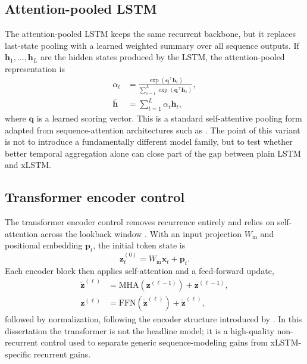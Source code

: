 \documentclass[12pt]{report}
\begin{document}
\subsection{Attention-pooled LSTM}
The attention-pooled LSTM keeps the same recurrent backbone, but it replaces last-state pooling with a learned weighted summary over all sequence outputs. If \(\mathbf{h}_1,\ldots,\mathbf{h}_L\) are the hidden states produced by the LSTM, the attention-pooled representation is
\begin{align}
\alpha_t &= \frac{\exp(\mathbf{q}^\top \mathbf{h}_t)}{\sum_{s=1}^{L}\exp(\mathbf{q}^\top \mathbf{h}_s)}, \\
\bar{\mathbf{h}} &= \sum_{t=1}^{L}\alpha_t \mathbf{h}_t,
\end{align}
where \(\mathbf{q}\) is a learned scoring vector. This is a standard self-attentive pooling form adapted from sequence-attention architectures such as \citet{lin2017selfattentive}. The point of this variant is not to introduce a fundamentally different model family, but to test whether better temporal aggregation alone can close part of the gap between plain LSTM and xLSTM.

\subsection{Transformer encoder control}
The transformer encoder control removes recurrence entirely and relies on self-attention across the lookback window \citep{vaswani2017}. With an input projection \(W_{\text{in}}\) and positional embedding \(\mathbf{p}_t\), the initial token state is
\[
\mathbf{z}^{(0)}_t = W_{\text{in}}\mathbf{x}_t + \mathbf{p}_t.
\]
Each encoder block then applies self-attention and a feed-forward update,
\begin{align}
\tilde{\mathbf{z}}^{(\ell)} &= \mathrm{MHA}\!\left(\mathbf{z}^{(\ell-1)}\right) + \mathbf{z}^{(\ell-1)}, \\
\mathbf{z}^{(\ell)} &= \mathrm{FFN}\!\left(\tilde{\mathbf{z}}^{(\ell)}\right) + \tilde{\mathbf{z}}^{(\ell)},
\end{align}
followed by normalization, following the encoder structure introduced by \citet{vaswani2017}. In this dissertation the transformer is not the headline model; it is a high-quality non-recurrent control used to separate generic sequence-modeling gains from xLSTM-specific recurrent gains.
\end{document}
